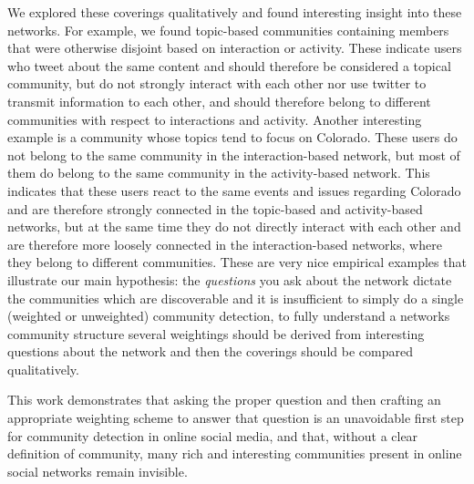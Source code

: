 \documentclass[10pt,a4paper]{article}
\begin{document}
We explored these coverings qualitatively and found interesting insight into these networks. For example, we found topic-based communities containing members that were otherwise disjoint based on interaction or activity. These indicate users who tweet about the same content and should therefore be considered a topical community, but do not strongly interact with each other nor use twitter to transmit information to each other, and should therefore belong to different communities with respect to interactions and activity.  Another interesting example is a community whose topics tend to focus on Colorado. These users do not belong to the same community in the interaction-based network, but most of them do belong to the same community in the activity-based network. This indicates that these users react to the same events and issues regarding Colorado and are therefore strongly connected in the topic-based and activity-based networks, but at the same time they do not directly interact with each other and are therefore more loosely connected in the interaction-based networks, where they belong to different communities. These are very nice empirical examples that illustrate our main hypothesis: the \emph{questions} you ask about the network dictate the communities which are discoverable and it is insufficient to simply do a single (weighted or unweighted) community detection, to fully understand a networks community structure several weightings should be derived from interesting questions about the network and then the coverings should be compared qualitatively.

 This work demonstrates that asking the proper question and then crafting an appropriate weighting scheme to answer that question is an unavoidable first step for community detection in online social media, and that, without a clear definition of community, many rich and interesting communities present in online social networks remain invisible.

\footnotesize

\end{document}
